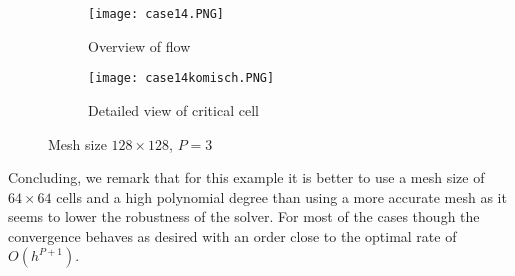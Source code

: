 	\begin{figure}[htp]
		\centering
		\begin{subfigure}[b]{0.5\textwidth}
			\centering
			\texttt{[image: case14.PNG]}
			\caption{Overview of flow}
			\label{fig:case14groß}
		\end{subfigure}%
		\begin{subfigure}[b]{0.5\textwidth}
			\centering
			\texttt{[image: case14komisch.PNG]}
			\caption{Detailed view of critical cell}
			\label{fig:case14detail}
		\end{subfigure}
		\caption{Mesh size $128 \times 128$, $P = 3$}\label{fig:case14}
	\end{figure}
	
	Concluding, we remark that for this example it is better to use a mesh size of $64 \times 64$ cells and a high polynomial degree than using a more accurate mesh as it seems to lower the robustness of the solver. For most of the cases though the convergence behaves as desired with an order close to the optimal rate of $O(h^{P+1})$.
	
